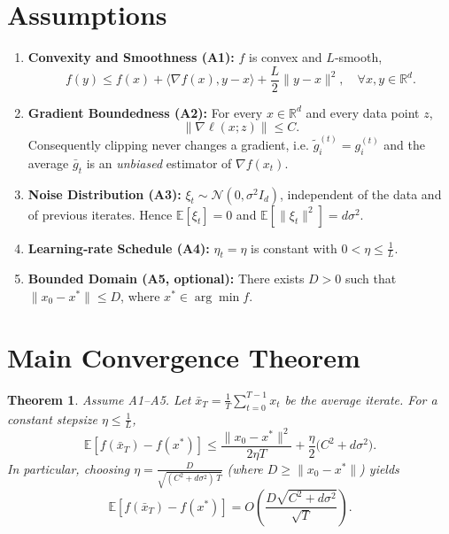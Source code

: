 \documentclass{article}
\newtheorem{theorem}{Theorem}
\newcommand{\EE}{\mathbb{E}}
\newcommand{\RR}{\mathbb{R}}
\begin{document}
\newpage
\section*{Assumptions}
\begin{enumerate}
\item \textbf{Convexity and Smoothness (A1):} $f$ is convex and $L$‑smooth,
\[
f(y)\le f(x)+\langle\nabla f(x),y-x\rangle+\frac{L}{2}\|y-x\|^{2},
\quad\forall x,y\in\RR^{d}.
\]
\item \textbf{Gradient Boundedness (A2):} For every $x\in\RR^{d}$ and every data point $z$,
\[
\|\nabla\ell(x;z)\|\le C .
\]
Consequently clipping never changes a gradient, i.e. $\tilde g_i^{(t)}=g_i^{(t)}$ and the
average $\bar g_t$ is an \emph{unbiased} estimator of $\nabla f(x_t)$.
\item \textbf{Noise Distribution (A3):} $\xi_t\sim\mathcal N(0,\sigma^{2}I_d)$, independent
of the data and of previous iterates. Hence $\EE[\xi_t]=0$ and
$\EE[\|\xi_t\|^{2}]=d\sigma^{2}$.
\item \textbf{Learning‑rate Schedule (A4):} $\eta_t=\eta$ is constant with
$0<\eta\le \frac{1}{L}$.
\item \textbf{Bounded Domain (A5, optional):} There exists $D>0$ such that
$\|x_0-x^{*}\|\le D$, where $x^{*}\in\arg\min f$.
\end{enumerate}

\section*{Main Convergence Theorem}
\begin{theorem}\label{thm:conv}
Assume A1--A5. Let $\bar x_T=\frac{1}{T}\sum_{t=0}^{T-1}x_t$
be the average iterate. For a constant stepsize $\eta\le \frac{1}{L}$,
\[
\EE\!\left[f(\bar x_T)-f(x^{*})\right]
\le
\frac{\|x_0-x^{*}\|^{2}}{2\eta T}
+\frac{\eta}{2}\bigl(C^{2}+d\sigma^{2}\bigr).
\tag{*}
\]
In particular, choosing $\displaystyle\eta=\frac{D}{\sqrt{(C^{2}+d\sigma^{2})\,T}}$
(where $D\ge\|x_0-x^{*}\|$) yields
\[
\EE\!\left[f(\bar x_T)-f(x^{*})\right]
=O\!\left(\frac{D\sqrt{C^{2}+d\sigma^{2}}}{\sqrt{T}}\right).
\]
\end{theorem}
\end{document}
